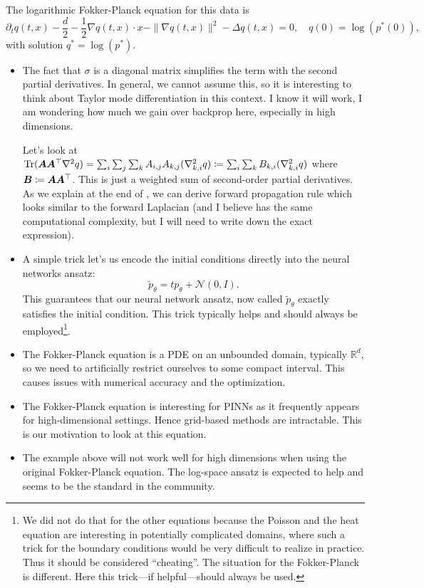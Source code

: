 The logarithmic Fokker-Planck equation for this data is 
\begin{equation}
    \partial_t q(t,x)
    -
    \frac d2
    -
    \frac12\nabla q(t,x)\cdot x
    -
    \| \nabla q(t,x) \|^2
    -
    \Delta q(t,x)
    =
    0,
    \quad 
    q(0) = \log(p^*(0)),
\end{equation}
with solution $q^* = \log(p^*)$.

\begin{itemize}
    \item The fact that $\sigma$ is a diagonal matrix simplifies the term with the second partial derivatives. In general, we cannot assume this, so it is interesting to think about Taylor mode differentiation in this context. I know it will work, I am wondering how much we gain over backprop here, especially in high dimensions. 

    Let's look at $\operatorname{Tr}({\bm{A}} {\bm{A}}^\top \nabla^2 q) = \sum_i \sum_j \sum_k {A}_{i,j} {A}_{k,j} (\nabla^2_{k,i} q) \coloneqq \sum_i \sum_k {B}_{k,i} (\nabla^2_{k,i} q)$ where ${\bm{B}} \coloneqq {\bm{A}} {\bm{A}}^\top$. This is just a weighted sum of second-order partial derivatives. As we explain at the end of , we can derive forward propagation rule which looks similar to the forward Laplacian (and I believe has the same computational complexity, but I will need to write down the exact expression).

    
    \item A simple trick let's us encode the initial conditions directly into the neural networks ansatz:
    \begin{equation}
        \tilde p_\theta = t p_\theta + \mathcal N(0, I).
    \end{equation}
    This guarantees that our neural network ansatz, now called $\tilde p_\theta$ exactly satisfies the initial condition. This trick typically helps and should always be employed\footnote{We did not do that for the other equations because the Poisson and the heat equation are interesting in potentially complicated domains, where such a trick for the boundary conditions would be very difficult to realize in practice. Thus it should be considered ``cheating''. The situation for the Fokker-Planck is different. Here this trick---if helpful---should always be used.}. 
    \item The Fokker-Planck equation is a PDE on an unbounded domain, typically $\mathbb R^d$, so we need to artificially restrict ourselves to some compact interval. This causes issues with numerical accuracy and the optimization.
    \item The Fokker-Planck equation is interesting for PINNs as it frequently appears for high-dimensional settings. Hence grid-based methods are intractable. This is our motivation to look at this equation.
    \item The example above will not work well for high dimensions when using the original Fokker-Planck equation. The log-space ansatz is expected to help and seems to be the standard in the community.
\end{itemize}